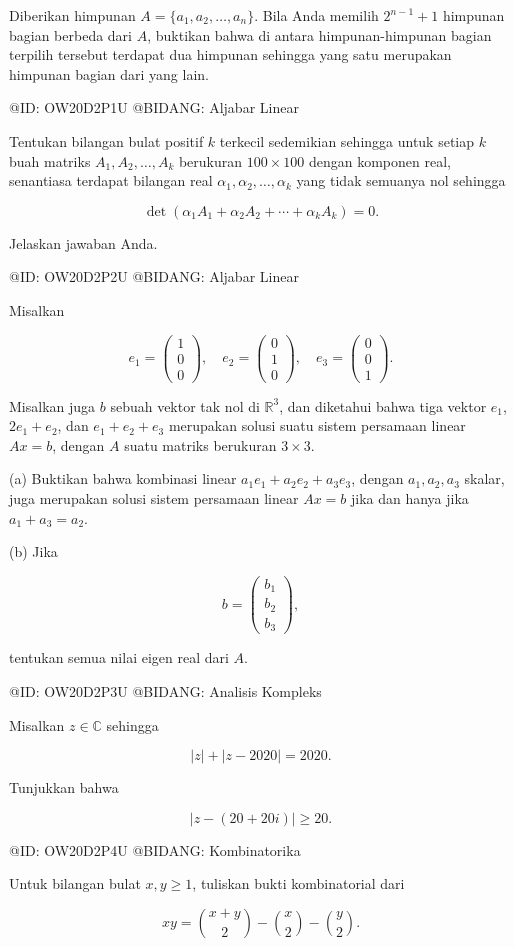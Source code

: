 Diberikan himpunan $A=\{a_1,a_2,\ldots,a_n\}$. Bila Anda memilih $2^{n-1}+1$ himpunan bagian berbeda dari $A$, buktikan bahwa di antara himpunan-himpunan bagian terpilih tersebut terdapat dua himpunan sehingga yang satu merupakan himpunan bagian dari yang lain.

@ID: OW20D2P1U
@BIDANG: Aljabar Linear

Tentukan bilangan bulat positif $k$ terkecil sedemikian sehingga untuk setiap $k$ buah matriks $A_1,A_2,\ldots,A_k$ berukuran $100\times100$ dengan komponen real, senantiasa terdapat bilangan real $\alpha_1,\alpha_2,\ldots,\alpha_k$ yang tidak semuanya nol sehingga

$$
\det(\alpha_1A_1+\alpha_2A_2+\cdots+\alpha_kA_k)=0.
$$

Jelaskan jawaban Anda.

@ID: OW20D2P2U
@BIDANG: Aljabar Linear

Misalkan

$$
e_1=\begin{pmatrix}1\\0\\0\end{pmatrix},\quad
e_2=\begin{pmatrix}0\\1\\0\end{pmatrix},\quad
e_3=\begin{pmatrix}0\\0\\1\end{pmatrix}.
$$

Misalkan juga $b$ sebuah vektor tak nol di $\mathbb R^3$, dan diketahui bahwa tiga vektor $e_1$, $2e_1+e_2$, dan $e_1+e_2+e_3$ merupakan solusi suatu sistem persamaan linear $Ax=b$, dengan $A$ suatu matriks berukuran $3\times3$.

(a) Buktikan bahwa kombinasi linear $a_1e_1+a_2e_2+a_3e_3$, dengan $a_1,a_2,a_3$ skalar, juga merupakan solusi sistem persamaan linear $Ax=b$ jika dan hanya jika $a_1+a_3=a_2$.

(b) Jika

$$
b=
\begin{pmatrix}
b_1\\
b_2\\
b_3
\end{pmatrix},
$$

tentukan semua nilai eigen real dari $A$.

@ID: OW20D2P3U
@BIDANG: Analisis Kompleks

Misalkan $z\in\mathbb C$ sehingga

$$
|z|+|z-2020|=2020.
$$

Tunjukkan bahwa

$$
|z-(20+20i)|\ge20.
$$

@ID: OW20D2P4U
@BIDANG: Kombinatorika

Untuk bilangan bulat $x,y\ge1$, tuliskan bukti kombinatorial dari

$$
xy=\binom{x+y}{2}-\binom{x}{2}-\binom{y}{2}.
$$